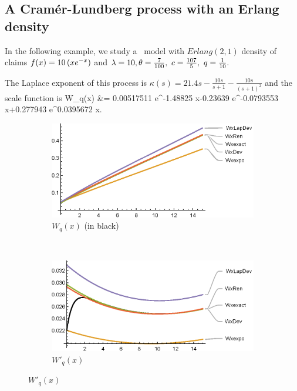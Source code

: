 \newpage

\subsection{A Cram\'{e}r-Lundberg process with an Erlang density} \label{e:AzcueM}

In the following example, we study a \CL\ model with  $Erlang(2,1)$  density of claims $f(x) = 10 \left(x e^{-x}\right)$ and  $\lambda=10, \theta = \frac{7}{100},\  c = \frac{107}{5},\ q=\frac{1}{10}.$

The Laplace exponent of this process is
$\kappa(s) = 21.4 s -\frac{10 s}{s+1}-\frac{10 s}{(s+1)^2}$ and the scale function is
\bea
W_q(x)  &= 0.00517511 e^{-1.48825 x}-0.23639 e^{-0.0793553 x}+0.277943 e^{0.0395672 x}.
\eea

\begin{figure}[!h]
    \centering
    \begin{subfigure}[b]{0.8\textwidth}
        \includegraphics[width=\textwidth]{AzcueMW}
        \caption{$W_q(x)$  (in black)}
        \label{fig:AzcueMW}
    \end{subfigure}
    ~
    \\
    \begin{subfigure}[b]{0.8\textwidth}
        \includegraphics[width=\textwidth]{AzcueMW1}
        \caption{$W'_q(x)$}
        \label{fig:AzcueMW1}

\end{subfigure}
\end{figure}
